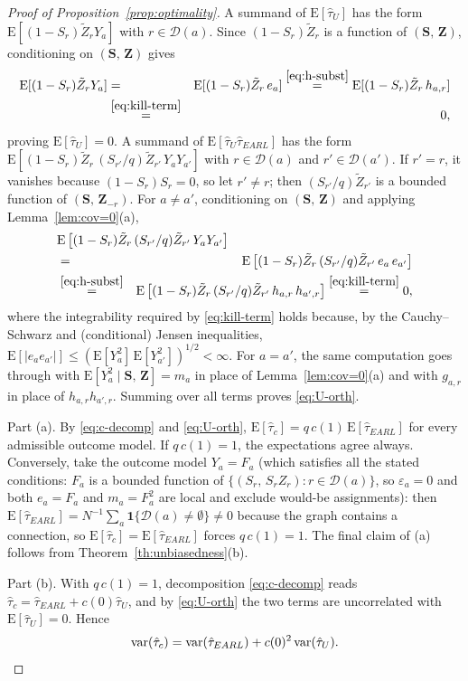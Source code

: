 \documentclass[sigconf,nonacm]{acmart}
\newcommand{\E}{\mathrm E}
\DeclareMathOperator{\var}{var}
\begin{document}
\begin{proof}[Proof of Proposition~\ref{prop:optimality}]
    A summand of $\E[\hat\tau_U]$ has the form $\E[(1-S_r)\tilde Z_rY_a]$ with $r\in\mathcal D(a)$. Since $(1-S_r)\tilde Z_r$ is a function of $(\mathbf S,\,\mathbf Z)$, conditioning on $(\mathbf S,\,\mathbf Z)$ gives
    \begin{eqnarray*}
        \E[(1-S_r)\tilde Z_rY_a] &=& \E[(1-S_r)\tilde Z_r\,e_a]
        \stackrel{\eqref{eq:h-subst}}{=} \E[(1-S_r)\tilde Z_r\,h_{a,r}]\\
        &\stackrel{\eqref{eq:kill-term}}{=}& 0,
    \end{eqnarray*}
    proving $\E[\hat\tau_U]=0$. A summand of $\E[\hat\tau_U\hat\tau_{EARL}]$ has the form $\E[(1-S_r)\tilde Z_r\, (S_{r'}/q)\tilde Z_{r'}\, Y_aY_{a'}]$ with $r\in\mathcal D(a)$ and $r'\in\mathcal D(a')$. If $r'=r$, it vanishes because $(1-S_r)S_r=0$, so let $r'\neq r$; then $(S_{r'}/q)\tilde Z_{r'}$ is a bounded function of $(\mathbf S,\,\mathbf Z_{-r})$. For $a\neq a'$, conditioning on $(\mathbf S,\,\mathbf Z)$ and applying Lemma~\ref{lem:cov=0}(a),
    \begin{eqnarray*}
        \lefteqn{\E\left[(1-S_r)\tilde Z_r\, (S_{r'}/q)\tilde Z_{r'}\, Y_aY_{a'}\right]}\\
        &=& \E\left[(1-S_r)\tilde Z_r\, (S_{r'}/q)\tilde Z_{r'}\, e_a\,e_{a'}\right]\\
        &\stackrel{\eqref{eq:h-subst}}{=}& \E\left[(1-S_r)\tilde Z_r\, (S_{r'}/q)\tilde Z_{r'}\, h_{a,r}\,h_{a',r}\right]
        \stackrel{\eqref{eq:kill-term}}{=} 0,
    \end{eqnarray*}
    where the integrability required by \eqref{eq:kill-term} holds because, by the Cauchy--Schwarz and (conditional) Jensen inequalities, $\E[|e_ae_{a'}|]\le(\E[Y_a^2]\,\E[Y_{a'}^2])^{1/2}<\infty$. For $a=a'$, the same computation goes through with $\E[Y_a^2\mid\mathbf S,\,\mathbf Z]=m_a$ in place of Lemma~\ref{lem:cov=0}(a) and with $g_{a,r}$ in place of $h_{a,r}h_{a',r}$. Summing over all terms proves \eqref{eq:U-orth}.

    Part (a). By \eqref{eq:c-decomp} and \eqref{eq:U-orth}, $\E[\hat\tau_c] = q\,c(1)\,\E[\hat\tau_{EARL}]$ for every admissible outcome model. If $q\,c(1)=1$, the expectations agree always. Conversely, take the outcome model $Y_a = F_a$ (which satisfies all the stated conditions: $F_a$ is a bounded function of $\{(S_r,\,S_rZ_r)\colon r\in\mathcal D(a)\}$, so $\varepsilon_a=0$ and both $e_a=F_a$ and $m_a=F_a^2$ are local and exclude would-be assignments): then $\E[\hat\tau_{EARL}] = N^{-1}\sum_a \mathbf 1\{\mathcal D(a)\neq\emptyset\}\neq 0$ because the graph contains a connection, so $\E[\hat\tau_c]=\E[\hat\tau_{EARL}]$ forces $q\,c(1)=1$. The final claim of (a) follows from Theorem~\ref{th:unbiasedness}(b).

    Part (b). With $q\,c(1)=1$, decomposition \eqref{eq:c-decomp} reads $\hat\tau_c = \hat\tau_{EARL} + c(0)\hat\tau_U$, and by \eqref{eq:U-orth} the two terms are uncorrelated with $\E[\hat\tau_U]=0$. Hence
    \begin{equation*}
        \var(\hat\tau_c) = \var(\hat\tau_{EARL}) + c(0)^2\var(\hat\tau_U). \qedhere
    \end{equation*}
\end{proof}
\end{document}
